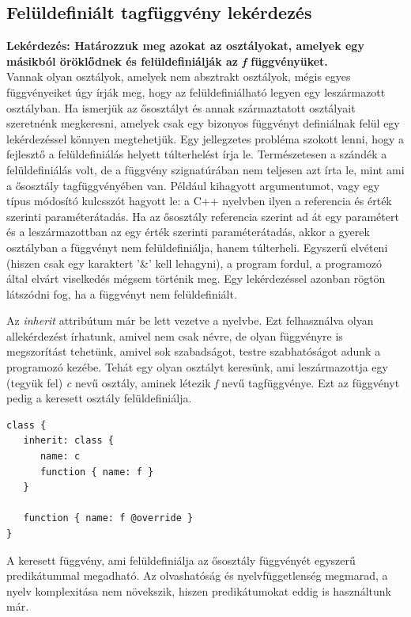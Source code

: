 \documentclass[a4paper,12pt]{report}
\begin{document}
\subsection{Felüldefiniált tagfüggvény lekérdezés}
\textbf{Lekérdezés: Határozzuk meg azokat az osztályokat, amelyek egy másikból öröklődnek és felüldefiniálják az \textit{f} függvényüket.}
\\
Vannak olyan osztályok, amelyek nem absztrakt osztályok, mégis egyes függvényeiket úgy írják meg, hogy az felüldefiniálható legyen egy leszármazott osztályban. Ha ismerjük az ősosztályt és annak származtatott osztályait szeretnénk megkeresni, amelyek csak egy bizonyos függvényt definiálnak felül egy lekérdezéssel könnyen megtehetjük. Egy jellegzetes probléma szokott lenni, hogy a fejlesztő a felüldefiniálás helyett túlterhelést írja le. Természetesen a szándék a felüldefiniálás volt, de a függvény szignatúrában nem teljesen azt írta le, mint ami a ősosztály tagfüggvényében van. Például kihagyott argumentumot, vagy egy típus módosító kulcsszót hagyott le: a C++ nyelvben ilyen a referencia és érték szerinti paraméterátadás. Ha az ősosztály referencia szerint ad át egy paramétert és a leszármazottban az egy érték szerinti paraméterátadás, akkor a gyerek osztályban a függvényt nem felüldefiniálja, hanem túlterheli. Egyszerű elvéteni (hiszen csak egy karaktert '\&' kell lehagyni), a program fordul, a programozó által elvárt viselkedés mégsem történik meg. Egy lekérdezéssel azonban rögtön látszódni fog, ha a függvényt nem felüldefiniált.
\par Az \textit{inherit} attribútum már be lett vezetve a nyelvbe. Ezt felhasználva olyan allekérdezést írhatunk, amivel nem csak névre, de olyan függvényre is megszorítást tehetünk, amivel sok szabadságot, testre szabhatóságot adunk a programozó kezébe. Tehát egy olyan osztályt keresünk, ami leszármazottja egy (tegyük fel) \textit{c} nevű osztály, aminek létezik \textit{f} nevű tagfüggvénye. Ezt az függvényt pedig a keresett osztály felüldefiniálja.
\begin{verbatim}
class {
   inherit: class { 
      name: c 	
      function { name: f } 
   }
   
   function { name: f @override }
}
\end{verbatim}
A keresett függvény, ami felüldefiniálja az ősosztály függvényét egyszerű predikátummal megadható. Az olvashatóság és nyelvfüggetlenség megmarad, a nyelv komplexitása nem növekszik, hiszen predikátumokat eddig is használtunk már.
\end{document}
